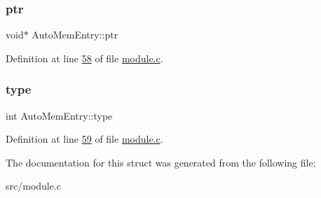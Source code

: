\subsubsection{\texorpdfstring{ptr}{ptr}}
{\footnotesize\ttfamily void$\ast$ Auto\+Mem\+Entry\+::ptr}



Definition at line \hyperlink{module_8c_source_l00058}{58} of file \hyperlink{module_8c_source}{module.\+c}.

\mbox{\label{structAutoMemEntry_a9df5deaf0ef1229c76c3b63833d71544}} 
\subsubsection{\texorpdfstring{type}{type}}
{\footnotesize\ttfamily int Auto\+Mem\+Entry\+::type}



Definition at line \hyperlink{module_8c_source_l00059}{59} of file \hyperlink{module_8c_source}{module.\+c}.



The documentation for this struct was generated from the following file\+:\begin{DoxyCompactItemize}
\item 
src/module.\+c\end{DoxyCompactItemize}
